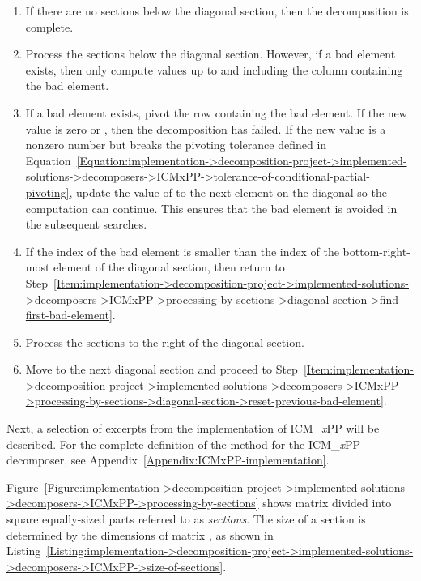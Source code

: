 \begin{enumerate}
\begin{enumerate}
		\end{enumerate}
	\item \label{Item:implementation->decomposition-project->implemented-solutions->decomposers->ICMxPP->processing-by-sections->no-lower-sections-check}
		If there are no sections below the diagonal section, then the decomposition is complete.
	\item \label{Item:implementation->decomposition-project->implemented-solutions->decomposers->ICMxPP->processing-by-sections->compute-lower-sections}
		Process the sections below the diagonal section.
However, if a bad element exists, then only compute values up to and including the column containing the bad element.
	\item If a bad element exists, pivot the row containing the bad element.
If the new value is zero or , then the decomposition has failed.
If the new value is a nonzero number but breaks the pivoting tolerance defined in Equation~\ref{Equation:implementation->decomposition-project->implemented-solutions->decomposers->ICMxPP->tolerance-of-conditional-partial-pivoting}, update the value of  to the next element on the diagonal so the computation can continue.
This ensures that the bad element is avoided in the subsequent searches.
	\item \label{Item:implementation->decomposition-project->implemented-solutions->decomposers->ICMxPP->processing-by-sections->diagonal-lower-sections-while-condition}
		If the index of the bad element is smaller than the index of the bottom-right-most element of the diagonal section, then return to Step~\ref{Item:implementation->decomposition-project->implemented-solutions->decomposers->ICMxPP->processing-by-sections->diagonal-section->find-first-bad-element}.
	\item Process the sections to the right of the diagonal section.
	\item Move to the next diagonal section and proceed to Step~\ref{Item:implementation->decomposition-project->implemented-solutions->decomposers->ICMxPP->processing-by-sections->diagonal-section->reset-previous-bad-element}.
\end{enumerate}

Next, a selection of excerpts from the implementation of ICM\_\textit{x}PP will be described.
For the complete definition of the  method for the ICM\_\textit{x}PP decomposer, see Appendix~\ref{Appendix:ICMxPP-implementation}.

Figure~\ref{Figure:implementation->decomposition-project->implemented-solutions->decomposers->ICMxPP->processing-by-sections} shows matrix  divided into square equally-sized parts referred to as \textit{sections}.
The size of a section is determined by the dimensions of matrix , as shown in Listing~\ref{Listing:implementation->decomposition-project->implemented-solutions->decomposers->ICMxPP->size-of-sections}.

